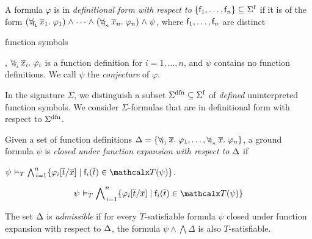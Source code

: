 \begin{definition}\rm
A formula $\varphi$ is in \emph{definitional form with respect to}
$\{ \con{f}_1, \ldots, \con{f}_n \} \subseteq \sfuns{\Sigma}$ if it is of the
form
%
%
$(\forallf{\con{f}_1} \vec x_1.\; \varphi_1) \wedge \cdots \wedge
(\forallf{\con{f}_n} \vec x_n.\; \varphi_n) \wedge \psi$,
%
where $\mathsf{f}_1, \ldots, \mathsf{f}_n$ are distinct\begin{rep} function symbols\end{rep},
$\forall_{\!\mathsf{f}_i\:} \overline{x}_i.\; \varphi_i$ is a function definition
for $i = 1, \ldots, n$,
%
and $\psi$ contains no function definitions.
We call $\psi$ the \emph{conjecture} of $\varphi$.
\end{definition}

In the signature $\Sigma$, we distinguish a subset $\sfundefs{\Sigma}
\subseteq \sfuns{\Sigma}$ of \emph{defined} uninterpreted function symbols.
We consider $\Sigma$-formulas that are in definitional form with respect to
$\sfundefs{\Sigma}$.

\newcommand\closurefmla{
  \ensuremath{\psi \models_T \bigwedge\nolimits_{\,i=1}^{n} \{ \varphi_i[ \vec t / \vec x ] \mid \con{f}_i( \vec t ) \in \terms( \psi ) \}} }

\begin{definition}\rm
Given a set of function definitions 
$\DDD = \{ \forallf{\con{f}_1} \vec x.\; \varphi_1, \ldots, \forallf{\con{f}_n} \vec x.\; \varphi_n \}$, 
a ground formula $\psi$ 
is \emph{closed under function expansion with respect to $\DDD$} if
\begin{conf}$\closurefmla$. \end{conf}%
\begin{rep}\[\closurefmla\]\end{rep}%
The set $\DDD$ is \emph{admissible} if for every $T$-satisfiable formula 
$\psi$ closed under function expansion with respect to $\DDD$,
the formula
$\psi \wedge \bigwedge \Delta$ is also $T$-satisfiable.
\end{definition}

